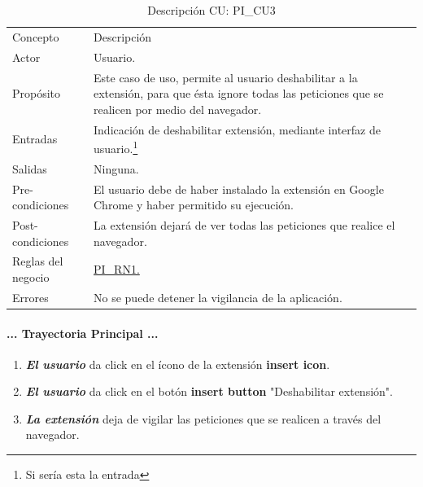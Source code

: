 \documentclass[12pt, a4paper, titlepage]{article}
\begin{document}
				\newpage
				\begin{table}[htb]
				\begin{center}
				\begin{tabular}{ |p{3.5cm}||p{9.5cm}|}
					\hline
					\rowcolor{guindapoli}
					\multicolumn{2}{|c|}{\textbf{\textcolor{white}{Caso de uso: PI\_CU3. Deshabilitar extensión.}}}\\
					\hline
					\rowcolor{azulfuerte}Concepto & Descripción\\
					\hline
					\cellcolor{azulclaro}Actor & 
					Usuario.\\ 
					\hline
					\cellcolor{azulclaro}Propósito &
					Este caso de uso, permite al usuario deshabilitar a la extensión, para que ésta ignore todas las peticiones que se realicen por medio del navegador.\\
					\hline
					\cellcolor{azulclaro}Entradas &
					Indicación de deshabilitar extensión, mediante interfaz de usuario.\footnote{Si sería esta la entrada}\\
					\hline
					\cellcolor{azulclaro}Salidas &
					Ninguna.\\
					\hline
					\cellcolor{azulclaro}Pre-condiciones&
					El usuario debe de haber instalado la extensión en Google Chrome y haber permitido su ejecución.\\
					\hline
					\cellcolor{azulclaro}Post-condiciones&
					La extensión dejará de ver todas las peticiones que realice el navegador.\\
					\hline
					\cellcolor{azulclaro}Reglas del negocio&
					\hyperref[PI_RN1]{PI\_RN1.}\\
					\hline
					\cellcolor{azulclaro}Errores &
					No se puede detener la vigilancia de la aplicación.\\
					\hline
				\end{tabular}
				\caption[DCU: PI\_CU3]{Descripción CU: PI\_CU3}
				\end{center}
				\end{table}
			
				\paragraph{... Trayectoria Principal ...}
				\begin{enumerate}
					\item \textbf{\textit{El usuario}} da click en el ícono de la extensión \textbf{insert icon}.
					\item \textbf{\textit{El usuario}} da click en el botón \textbf{insert button} "Deshabilitar extensión".
					\item \textbf{\textit{La extensión}} deja de vigilar las peticiones que se realicen a través del navegador.
				\end{enumerate}
\end{document}
